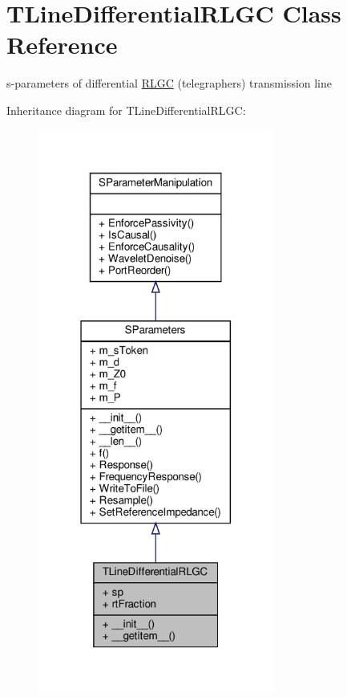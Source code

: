 \hypertarget{classSignalIntegrity_1_1SParameters_1_1Devices_1_1TLineDifferentialRLGC_1_1TLineDifferentialRLGC}{}\section{T\+Line\+Differential\+R\+L\+GC Class Reference}
\label{classSignalIntegrity_1_1SParameters_1_1Devices_1_1TLineDifferentialRLGC_1_1TLineDifferentialRLGC}


s-\/parameters of differential \hyperlink{namespaceSignalIntegrity_1_1SParameters_1_1RLGC}{R\+L\+GC} (telegrapher\textquotesingle{}s) transmission line  




Inheritance diagram for T\+Line\+Differential\+R\+L\+GC\+:\nopagebreak
\begin{figure}[H]
\begin{center}
\leavevmode
\includegraphics[width=220pt]{classSignalIntegrity_1_1SParameters_1_1Devices_1_1TLineDifferentialRLGC_1_1TLineDifferentialRLGC__inherit__graph}
\end{center}
\end{figure}


